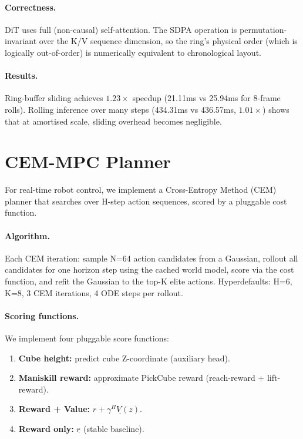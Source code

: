 \documentclass[letterpaper,twocolumn,10pt]{article}
\begin{document}
\paragraph{Correctness.}
DiT uses full (non-causal) self-attention.  The SDPA operation is
permutation-invariant over the K/V sequence dimension, so the ring's
physical order (which is logically out-of-order) is numerically
equivalent to chronological layout.

\paragraph{Results.}
Ring-buffer sliding achieves $1.23\times$ speedup (21.11ms vs 25.94ms
for 8-frame rolls).  Rolling inference over many steps (434.31ms vs
436.57ms, $1.01\times$) shows that at amortised scale, sliding overhead
becomes negligible.

\section{CEM-MPC Planner}

For real-time robot control, we implement a Cross-Entropy Method (CEM)
planner that searches over H-step action sequences, scored by a
pluggable cost function.

\paragraph{Algorithm.}
Each CEM iteration: sample N=64 action candidates from a Gaussian,
rollout all candidates for one horizon step using the cached world model,
score via the cost function, and refit the Gaussian to the top-K elite
actions.  Hyperdefaults: H=6, K=8, 3 CEM iterations, 4 ODE steps per
rollout.

\paragraph{Scoring functions.}
We implement four pluggable score functions:
\begin{enumerate}
  \item \textbf{Cube height:} predict cube Z-coordinate (auxiliary head).
  \item \textbf{Maniskill reward:} approximate PickCube reward
        (reach-reward + lift-reward).
  \item \textbf{Reward + Value:} $r_{\hat{}}  + \gamma^H V_{\hat{}}(z)$.
  \item \textbf{Reward only:} $r_{\hat{}}$ (stable baseline).
\end{enumerate}
\end{document}
